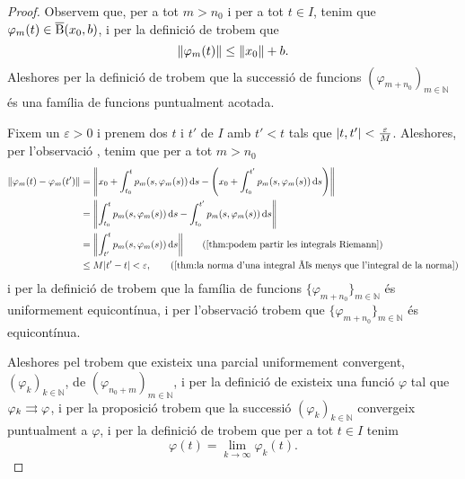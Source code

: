 \documentclass[../../Main.tex]{subfiles}
\begin{document}
\begin{theorem}
\begin{proof}
			Observem que, per a tot \(m>n_{0}\) i per a tot \(t\in I\), tenim que \(\varphi_{m}(t)\in\overline{\operatorname{B}}(x_{0},b)\), i per la definició de  trobem que
			\[
			    \norm{\varphi_{m}(t)}\leq\norm{x_{0}}+b.
			\]
			Aleshores per la definició de  trobem que la successió de funcions \((\varphi_{m+n_{0}})_{m\in\mathbb{N}}\) és una família de funcions puntualment acotada.
			
			Fixem un \(\varepsilon>0\) i prenem dos \(t\) i \(t'\) de \(I\) amb \(t'<t\) tals que \(\abs{t,t'}<\frac{\varepsilon}{M}\).
			Aleshores, per l'observació , tenim que per a tot \(m>n_{0}\)
			\begin{align*}
				\norm{\varphi_{m}(t)-\varphi_{m}(t')}&=\norm{x_{0}+\int_{t_{0}}^{t}p_{m}(s,\varphi_{m}(s))\diff s-\Bigg(x_{0}+\int_{t_{0}}^{t'}p_{m}(s,\varphi_{m}(s))\diff s\Bigg)} \\
				&=\norm{\int_{t_{0}}^{t}p_{m}(s,\varphi_{m}(s))\diff s-\int_{t_{0}}^{t'}p_{m}(s,\varphi_{m}(s))\diff s} \\
				&=\norm{\int_{t'}^{t}p_{m}(s,\varphi_{m}(s))\diff s} \tag{\ref{thm:podem partir les integrals Riemann}} \\
				&\leq M\abs{t'-t}<\varepsilon, \tag{\ref{thm:la norma d'una integral és menys que l'integral de la norma}}
			\end{align*}
			i per la definició de  trobem que la família de funcions \(\{\varphi_{m+n_{0}}\}_{m\in\mathbb{N}}\) és uniformement equicontínua, i per l'observació  trobem que \(\{\varphi_{m+n_{0}}\}_{m\in\mathbb{N}}\) és equicontínua.
			
			Aleshores pel  trobem que existeix una parcial uniformement convergent, \((\varphi_{k})_{k\in\mathbb{N}}\), de \((\varphi_{n_{0}+m})_{m\in\mathbb{N}}\), i per la definició de  existeix una funció \(\varphi\) tal que \(\varphi_{k}\mathrel{\rightrightarrows}\varphi\), i per la proposició  trobem que la successió \((\varphi_{k})_{k\in\mathbb{N}}\) convergeix puntualment a \(\varphi\), i per la definició de  trobem que per a tot \(t\in I\) tenim
			\begin{equation}
				\label{thm:Teorema de Peano:eq1}
				\varphi(t)=\lim_{k\to\infty}\varphi_{k}(t).
			\end{equation}
			

\end{proof}
\end{theorem}
\end{document}
